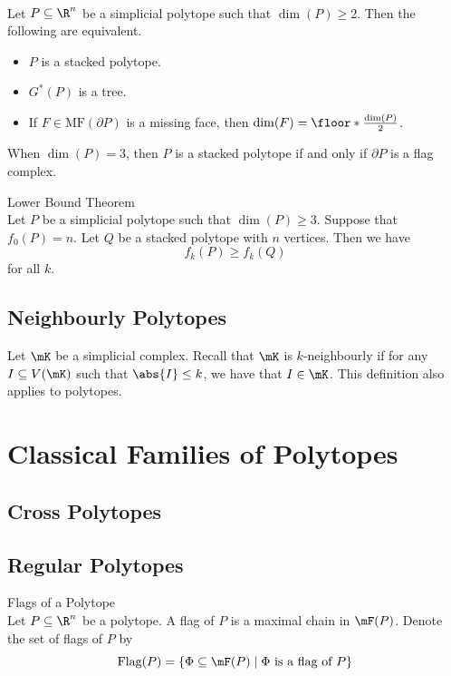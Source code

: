 \documentclass[a4paper]{article}
\begin{document}
\begin{prp}{}{}\\
Let $P\subseteq\R^n$ be a simplicial polytope such that $\dim(P)\geq 2$. Then the following are equivalent. 
\begin{itemize}
\item $P$ is a stacked polytope. 
\item $G^\ast(P)$ is a tree. 
\item If $F\in\text{MF}(\partial P)$ is a missing face, then $\dim(F)=\floor*{\frac{\dim(P)}{2}}$. 
\end{itemize}
\end{prp}

When $\dim(P)=3$, then $P$ is a stacked polytope if and only if $\partial P$ is a flag complex. 

\begin{thm}{Lower Bound Theorem}{}\\
Let $P$ be a simplicial polytope such that $\dim(P)\geq 3$. Suppose that $f_0(P)=n$. Let $Q$ be a stacked polytope with $n$ vertices. Then we have $$f_k(P)\geq f_k(Q)$$ for all $k$. 
\end{thm}

\subsection{Neighbourly Polytopes}
Let $\mK$ be a simplicial complex. Recall that $\mK$ is $k$-neighbourly if for any $I\subseteq V(\mK)$ such that $\abs{I}\leq k$, we have that $I\in\mK$. This definition also applies to polytopes. 

\pagebreak
\section{Classical Families of Polytopes}
\subsection{Cross Polytopes}

\subsection{Regular Polytopes}
\begin{defn}{Flags of a Polytope}{}\\
Let $P\subseteq\R^n$ be a polytope. A flag of $P$ is a maximal chain in $\mF(P)$. Denote the set of flags of $P$ by $$\text{Flag}(P)=\{\Phi\subseteq\mF(P)\;|\;\Phi\text{ is a flag of }P\}$$
\end{defn}
\end{document}
